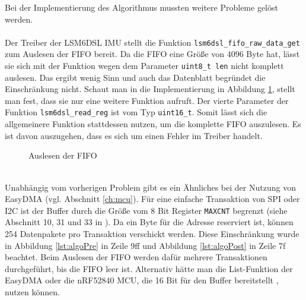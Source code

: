 Bei der Implementierung des Algorithmus mussten weitere Probleme gelöst werden.\\\\
Der Treiber der LSM6DSL IMU stellt die Funktion \texttt{lsm6dsl\_fifo\_raw\_data\_get} zum Auslesen der FIFO bereit.
Da die FIFO eine Größe von 4096 Byte hat, lässt sie sich mit der Funktion wegen dem Parameter \texttt{uint8\_t len} nicht komplett auslesen.
Das ergibt wenig Sinn und auch das Datenblatt begründet die Einschränkung nicht.
Schaut man in die Implementierung in Abbildung \ref{lst:fifoRead}, stellt man fest, dass sie nur eine weitere Funktion aufruft.
Der vierte Parameter der Funktion \texttt{lsm6dsl\_read\_reg} ist vom Typ \texttt{uint16\_t}.
Somit lässt sich die allgemeinere Funktion stattdessen nutzen, um die komplette FIFO auszulesen.
Es ist davon auszugehen, dass es sich um einen Fehler im Treiber handelt.
\begin{figure}[hbtp]
	
	\caption{Auslesen der FIFO}
	\label{lst:fifoRead}
\end{figure}\\
Unabhängig vom vorherigen Problem gibt es ein Ähnliches bei der Nutzung von EasyDMA (vgl. Abschnitt \ref{ch:mcu}).
Für eine einfache Transaktion von SPI oder I2C ist der Buffer durch die Größe vom 8 Bit Register \texttt{MAXCNT} begrenzt (siehe Abschnitt 10, 31 und 33 in \cite{datasheet_nrf52832}).
Da ein Byte für die Adresse reserviert ist, können 254 Datenpakete pro Transaktion verschickt werden.
Diese Einschränkung wurde in Abbildung \ref{lst:algoPre} in Zeile 9ff und Abbildung \ref{lst:algoPost} in Zeile 7f beachtet.
Beim Auslesen der FIFO werden dafür mehrere Transaktionen durchgeführt, bis die FIFO leer ist.
Alternativ hätte man die List-Funktion der EasyDMA oder die nRF52840 MCU, die 16 Bit für den Buffer bereitstellt \cite{datasheet_nrf52840}, nutzen können.

